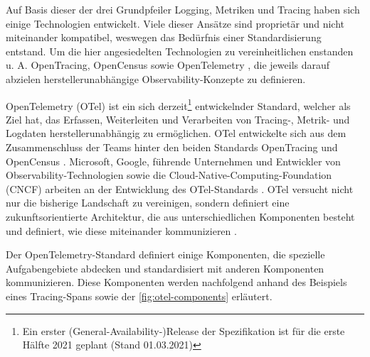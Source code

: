 
Auf Basis dieser der drei Grundpfeiler Logging, Metriken und Tracing haben sich einige Technologien entwickelt. Viele dieser Ansätze sind proprietär und nicht miteinander kompatibel, weswegen das Bedürfnis einer Standardisierung entstand. Um die hier angesiedelten Technologien zu vereinheitlichen enstanden u. A. OpenTracing, OpenCensus \cite{OpenCensus} sowie OpenTelemetry \cite{OpenTelemetry}, die jeweils darauf abzielen herstellerunabhängige Observability-Konzepte zu definieren.

OpenTelemetry (OTel) ist ein sich derzeit\footnote{Ein erster (General-Availability-)Release der Spezifikation ist für die erste Hälfte 2021 geplant \cite{OpenTelemetryGARelease} (Stand 01.03.2021)} entwickelnder Standard, welcher als Ziel hat, das Erfassen, Weiterleiten und Verarbeiten von Tracing-, Metrik- und Logdaten\footnotemark{} herstellerunabhängig zu ermöglichen. OTel entwickelte sich aus dem Zusammenschluss der Teams hinter den beiden Standards OpenTracing und OpenCensus  \cite{UseNixDistributiveTracing}. Microsoft, Google, führende Unternehmen und Entwickler von Observability-Technologien sowie die Cloud-Native-Computing-Foundation (CNCF) arbeiten an der Entwicklung des OTel-Standards \cite{DistributedTracingInPractice} \cite{OpenTelemetryCommunityMembers}. OTel versucht nicht nur die bisherige Landschaft zu vereinigen, sondern definiert eine zukunftsorientierte Architektur, die aus unterschiedlichen Komponenten besteht und definiert, wie diese miteinander kommunizieren \cite{DistributedTracingInPractice}.


Der OpenTelemetry-Standard definiert einige Komponenten, die spezielle Aufgabengebiete abdecken und standardisiert mit anderen Komponenten kommunizieren. Diese Komponenten werden nachfolgend anhand des Beispiels eines Tracing-Spans sowie der \autoref{fig:otel-components} erläutert.

